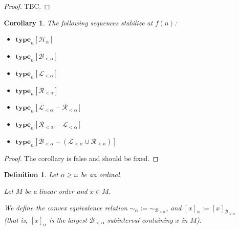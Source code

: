 \documentclass{article}
\newtheorem{corollary}{Corollary}
\newtheorem{definition}{Definition}
\newcommand{\brackets}[1]{\left[ {#1} \right]}
\newcommand{\type}[2]{\mathbf{type}_{#1} \brackets{#2}}
\begin{document}
\begin{proof}
  TBC.
\end{proof}

\begin{corollary}
  The following sequences stabilize at $f(n)$:

  \begin{itemize}
    \item $\type{n}{\mathcal{H}_{\alpha}}$
    \item $\type{n}{\mathcal{B}_{< \alpha}}$
    \item $\type{n}{\mathcal{L}_{< \alpha}}$
    \item $\type{n}{\mathcal{R}_{< \alpha}}$
    \item $\type{n}{\mathcal{L}_{< \alpha} - \mathcal{R}_{< \alpha}}$
    \item $\type{n}{\mathcal{R}_{< \alpha} - \mathcal{L}_{< \alpha}}$
    \item $\type{n}{\mathcal{B}_{< \alpha} - (\mathcal{L}_{< \alpha} \cup \mathcal{R}_{< \alpha})}$
  \end{itemize}
\end{corollary}

\begin{proof}
  The corollary is false and should be fixed.
\end{proof}

\begin{definition}
  Let $\alpha \ge \omega$ be an ordinal.

  Let $M$ be a linear order and $x \in M$.

  We define the convex equivalence relation $\sim_\alpha := \sim_{\mathcal{B}_{< \alpha}}$,
  and $\brackets{x}_{\alpha} := \brackets{x}_{\mathcal{B}_{< \alpha}}$ (that is,
  $\brackets{x}_{\alpha}$ is the largest $\mathcal{B}_{< \alpha}$-subinterval
  containing $x$ in $M$).
\end{definition}
\end{document}
